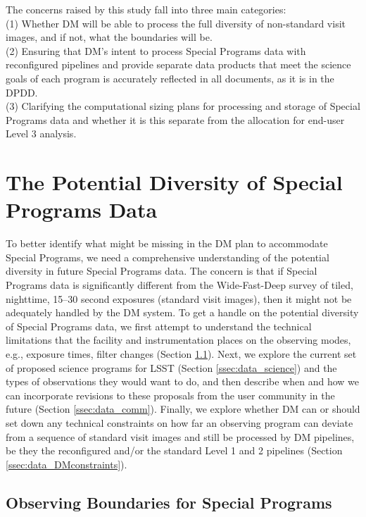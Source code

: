 \documentclass[DM,lsstdraft,toc]{lsstdoc}
\begin{document}
\noindent The concerns raised by this study fall into three main categories: \\
(1) Whether DM will be able to process the full diversity of non-standard visit images, and if not, what the boundaries will be. \\
(2) Ensuring that DM's intent to process Special Programs data with reconfigured pipelines and provide separate data products that meet the science goals of each program is accurately reflected in all documents, as it is in the DPDD. \\
(3) Clarifying the computational sizing plans for processing and storage of Special Programs data and whether it is this separate from the allocation for end-user Level 3 analysis.



\section{The Potential Diversity of Special Programs Data} \label{ssec:data}

To better identify what might be missing in the DM plan to accommodate Special Programs, we need a comprehensive understanding of the potential diversity in future Special Programs data. The concern is that if Special Programs data is significantly different from the Wide-Fast-Deep survey of tiled, nighttime, 15--30 second exposures (standard visit images), then it might not be adequately handled by the DM system. To get a handle on the potential diversity of Special Programs data, we first attempt to understand the technical limitations that the facility and instrumentation places on the observing modes, e.g., exposure times, filter changes (Section \ref{ssec:data_bounds}). Next, we explore the current set of proposed science programs for LSST (Section \ref{ssec:data_science}) and the types of observations they would want to do, and then describe when and how we can incorporate revisions to these proposals from the user community in the future (Section \ref{ssec:data_comm}). Finally, we explore whether DM can or should set down any technical constraints on how far an observing program can deviate from a sequence of standard visit images and still be processed by DM pipelines, be they the reconfigured and/or the standard Level 1 and 2 pipelines (Section \ref{ssec:data_DMconstraints}).


\subsection{Observing Boundaries for Special Programs}\label{ssec:data_bounds}
\end{document}
